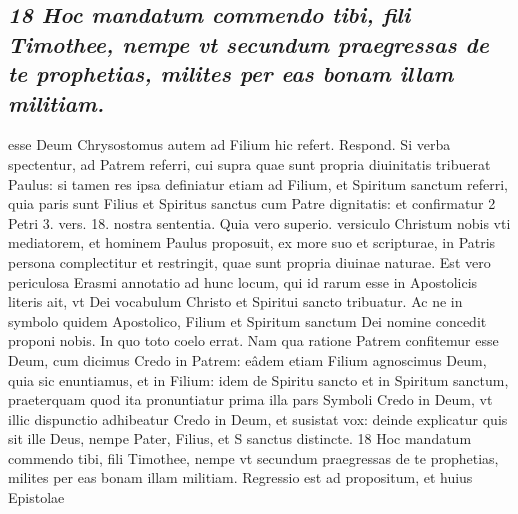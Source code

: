 \documentclass{article}
\begin{document}
\begin{pages}
\subsection*{\textit{18 Hoc mandatum commendo tibi, fili Timothee, nempe vt secundum praegressas de te prophetias, milites per eas bonam illam militiam.}}esse Deum Chrysostomus autem ad Filium hic refert. Respond. Si verba spectentur, ad Patrem referri, cui supra quae sunt propria diuinitatis tribuerat Paulus: si tamen res ipsa definiatur etiam ad Filium, et Spiritum sanctum referri, quia paris sunt Filius et Spiritus sanctus cum Patre dignitatis: et confirmatur 2 Petri 3. vers. 18. nostra sententia. Quia vero superio. versiculo Christum nobis vti mediatorem, et hominem Paulus proposuit, ex more suo et scripturae, in Patris persona complectitur et restringit, quae sunt propria diuinae naturae. Est vero periculosa Erasmi annotatio ad hunc locum, qui id rarum esse in Apostolicis literis ait, vt Dei vocabulum Christo et Spiritui sancto tribuatur. Ac ne in symbolo quidem Apostolico, Filium et Spiritum sanctum Dei nomine concedit proponi nobis. In quo toto coelo errat. Nam qua ratione Patrem confitemur esse Deum, cum dicimus Credo in Patrem: eâdem etiam Filium agnoscimus Deum, quia sic enuntiamus, et in Filium: idem de Spiritu sancto et in Spiritum sanctum, praeterquam quod ita pronuntiatur prima illa pars Symboli Credo in Deum, vt illic dispunctio adhibeatur Credo in Deum, et susistat vox: deinde explicatur quis sit ille Deus, nempe Pater, Filius, et S sanctus distincte. 18 Hoc mandatum commendo tibi, fili Timothee, nempe vt secundum praegressas de te prophetias, milites per eas bonam illam militiam. Regressio est ad propositum, et huius Epistolae  \pend

\end{pages}
\end{document}
